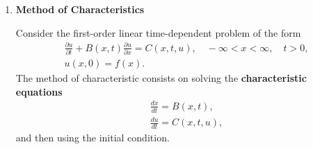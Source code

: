 \begin{enumerate}
% 
% 
% 

\item \textbf{Method of Characteristics}

Consider the first-order linear time-dependent problem of the form
\[
\begin{aligned}
    & \frac{\partial u}{\partial t} + B(x,t)\frac{\partial u}{\partial x} = C(x,t,u) , \quad -\infty<x<\infty, \quad t>0, \\
    & u(x,0)=f(x).
\end{aligned}
\]
The method of characteristic consists on solving the \textbf{characteristic equations}
\[
\begin{aligned}
    & \frac{d x}{d t} = B(x,t),\\
    & \frac{d u}{d t} = C(x,t,u),
\end{aligned}
\]
and then using the initial condition.



\end{enumerate}
